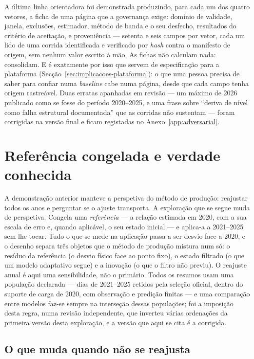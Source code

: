 A última linha orientadora foi demonstrada produzindo, para cada um dos
quatro vetores, a ficha de uma página que a governança exige: domínio de
validade, janela, exclusões, estimador, método de banda e o seu desfecho,
resultados do critério de aceitação, e proveniência --- setenta e seis
campos por vetor, cada um lido de uma corrida identificada e verificado por
\emph{hash} contra o manifesto de origem, sem nenhum valor escrito à mão. As
fichas não calculam nada: consolidam. E é exatamente por isso que servem de
especificação para a plataforma (Secção~\ref{sec:implicacoes-plataforma}): o
que uma pessoa precisa de saber para confiar numa \emph{baseline} cabe numa
página, desde que cada campo tenha origem rastreável. Duas erratas
apanhadas em revisão --- um máximo de 2026 publicado como se fosse do
período 2020--2025, e uma frase sobre ``deriva de nível como falha estrutural
documentada'' que as corridas não sustentam --- foram corrigidas na versão
final e ficam registadas no Anexo~\ref{app:adversarial}.

\section{Referência congelada e verdade conhecida}
\label{sec:referencia-congelada}

A demonstração anterior manteve a perspetiva do método de produção:
reajustar todos os anos e perguntar se o ajuste transporta. A exploração
que se segue muda de perspetiva. Congela uma \emph{referência} --- a relação
estimada em 2020, com a sua escala de erro e, quando aplicável, o seu estado
inicial --- e aplica-a a 2021--2025 sem lhe tocar. Tudo o que se mede na
aplicação passa a ser desvio face a 2020, e o desenho separa três objetos
que o método de produção mistura num só: o resíduo da referência (o desvio
físico face ao ponto fixo), o estado filtrado (o que um modelo adaptativo
segue) e a inovação (o que o filtro não previu). O reajuste anual é aqui
uma sensibilidade, não o primário. Todos os resumos usam uma população
declarada --- dias de 2021--2025 retidos pela seleção oficial, dentro do
suporte de carga de 2020, com observação e predição finitas --- e uma
comparação entre modelos faz-se sempre na interseção dessas populações; foi
a imposição desta regra, numa revisão independente, que inverteu várias
ordenações da primeira versão desta exploração, e a versão que aqui se cita
é a corrigida.

\subsection{O que muda quando não se reajusta}
\label{sec:referencia-fixa}

